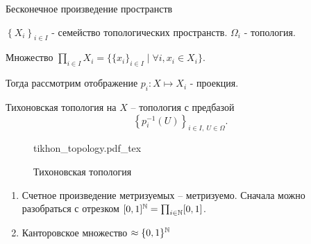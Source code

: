 \documentclass[12pt]{report}
\newcommand{\incfig}[1]{%
    \def\svgwidth{\columnwidth}
    {#1.pdf_tex}
}
\begin{document}
\begin{defn}
    Бесконечное произведение пространств

    $\left \{ X_i \right \}_{i \in  I}$ - семейство топологических пространств. $\Omega_i$ - топология.

    Множество $\prod_{i \in  I} X_i = \{\{x_i\}_{i \in  I}\mid \forall i, x_i \in  X_i \}$.

    Тогда рассмотрим отображение $p_i: X \mapsto X_i$ - проекция.
    
    Тихоновская топология на $X$ -- топология с предбазой
    \[
	\left \{ p^{-1}_i (U) \right \}_{i \in  I, ~ U \in  \Omega}
    .\] 
\begin{figure}[ht]
    \centering
    \incfig{tikhon_topology}
    \caption{Тихоновская топология}
    \label{fig:tikhon_topology}
\end{figure}
\end{defn}
\begin{tasks}
    \begin{enumerate}
	\item Счетное произведение метризуемых -- метризуемо. Сначала можно разобраться с отрезком $[0, 1]^{\mathbb{N}} = \prod_{i \in  \mathbb{N}} [0, 1]$.
	\item Канторовское множество $\approx \{0, 1\}^{\mathbb{N}}$
    \end{enumerate}
\end{tasks}
\end{document}

